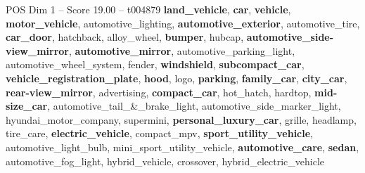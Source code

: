 \begin{textsample}{POS Dim 1 – Score 19.00 – t004879}  \label{ex:f1_pos_022}
\textbf{land\_vehicle}, \textbf{car}, \textbf{vehicle}, \textbf{motor\_vehicle}, automotive\_lighting, \textbf{automotive\_exterior}, automotive\_tire, \textbf{car\_door}, hatchback, alloy\_wheel, \textbf{bumper}, hubcap, \textbf{automotive\_side-view\_mirror}, \textbf{automotive\_mirror}, automotive\_parking\_light, automotive\_wheel\_system, fender, \textbf{windshield}, \textbf{subcompact\_car}, \textbf{vehicle\_registration\_plate}, \textbf{hood}, logo, \textbf{parking}, \textbf{family\_car}, \textbf{city\_car}, \textbf{rear-view\_mirror}, advertising, \textbf{compact\_car}, hot\_hatch, hardtop, \textbf{mid-size\_car}, automotive\_tail\_\&\_brake\_light, automotive\_side\_marker\_light, hyundai\_motor\_company, supermini, \textbf{personal\_luxury\_car}, grille, headlamp, tire\_care, \textbf{electric\_vehicle}, compact\_mpv, \textbf{sport\_utility\_vehicle}, automotive\_light\_bulb, mini\_sport\_utility\_vehicle, \textbf{automotive\_care}, \textbf{sedan}, automotive\_fog\_light, hybrid\_vehicle, crossover, hybrid\_electric\_vehicle

\end{textsample}
